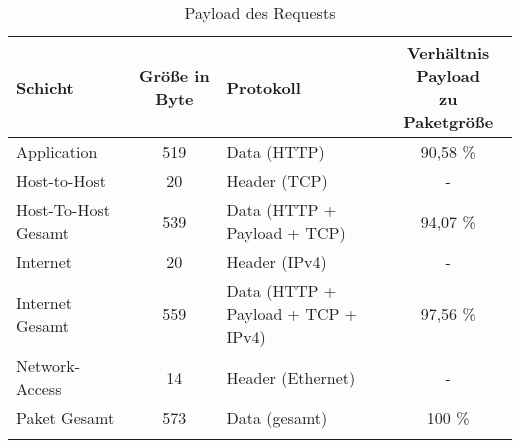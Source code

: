 \begin{longtable}{l|c|l|c}
    \hline
    Schicht & Größe in Byte & Protokoll & \makecell[l]{Verhältnis Payload \\zu Paketgröße}
    \\\hline
    Application & 519 & Data (HTTP) & 90,58 \%
    \\\hline
    Host-to-Host & 20 & Header (TCP) & -
    \\\hline
    Host-To-Host Gesamt & 539 & Data (HTTP + Payload + TCP) & 94,07 \%
    \\\hline
    Internet & 20 & Header (IPv4) & -
    \\\hline
    Internet Gesamt & 559 & Data (HTTP + Payload + TCP + IPv4) & 97,56 \%
    \\\hline
    Network-Access & 14 & Header (Ethernet) & - 
    \\\hline
    Paket Gesamt & 573 & Data (gesamt) & 100 \%
    \\
    \caption{Payload des Requests}
\end{longtable}